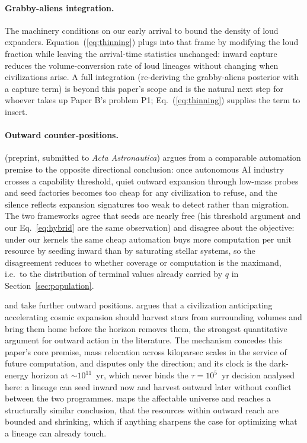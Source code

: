 \documentclass[11pt]{article}
\begin{document}
\paragraph{Grabby-aliens integration.} The \citet{Hanson2021} machinery conditions on our early arrival to bound the density of loud expanders. Equation~(\ref{eq:thinning}) plugs into that frame by modifying the loud fraction while leaving the arrival-time statistics unchanged: inward capture reduces the volume-conversion rate of loud lineages without changing when civilizations arise. A full integration (re-deriving the grabby-aliens posterior with a capture term) is beyond this paper's scope and is the natural next step for whoever takes up Paper B's problem P1; Eq.~(\ref{eq:thinning}) supplies the term to insert.

\paragraph{Outward counter-positions.} \citet{Ivliev2026} (preprint, submitted to \emph{Acta Astronautica}) argues from a comparable automation premise to the opposite directional conclusion: once autonomous AI industry crosses a capability threshold, quiet outward expansion through low-mass probes and seed factories becomes too cheap for any civilization to refuse, and the silence reflects expansion signatures too weak to detect rather than migration. The two frameworks agree that seeds are nearly free (his threshold argument and our Eq.~\ref{eq:hybrid} are the same observation) and disagree about the objective: under our kernels the same cheap automation buys more computation per unit resource by seeding inward than by saturating stellar systems, so the disagreement reduces to whether coverage or computation is the maximand, i.e.\ to the distribution of terminal values already carried by $q$ in Section~\ref{sec:population}.

\citet{Hooper2018} and \citet{Ord2021} take further outward positions. \citet{Hooper2018} argues that a civilization anticipating accelerating cosmic expansion should harvest stars from surrounding volumes and bring them home before the horizon removes them, the strongest quantitative argument for outward action in the literature. The mechanism concedes this paper's core premise, mass relocation across kiloparsec scales in the service of future computation, and disputes only the direction; and its clock is the dark-energy horizon at $\sim$$10^{11}$~yr, which never binds the $\tau = 10^{5}$~yr decision analysed here: a lineage can seed inward now and harvest outward later without conflict between the two programmes. \citet{Ord2021} maps the affectable universe and reaches a structurally similar conclusion, that the resources within outward reach are bounded and shrinking, which if anything sharpens the case for optimizing what a lineage can already touch.
\end{document}
